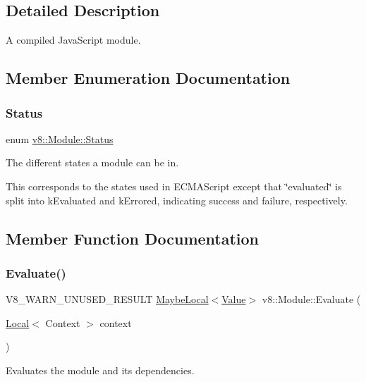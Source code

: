\subsection{Detailed Description}
A compiled Java\+Script module. 

\subsection{Member Enumeration Documentation}
\mbox{\label{classv8_1_1Module_a9c2a22c9cb8e928d570c38648c648b7e}} 
\subsubsection{\texorpdfstring{Status}{Status}}
{\footnotesize\ttfamily enum \mbox{\hyperlink{classv8_1_1Module_a9c2a22c9cb8e928d570c38648c648b7e}{v8\+::\+Module\+::\+Status}}}

The different states a module can be in.

This corresponds to the states used in E\+C\+M\+A\+Script except that \char`\"{}evaluated\char`\"{} is split into k\+Evaluated and k\+Errored, indicating success and failure, respectively. 

\subsection{Member Function Documentation}
\mbox{\label{classv8_1_1Module_a0785fa83cd3dde1dee086e1f9d31abdc}} 
\subsubsection{\texorpdfstring{Evaluate()}{Evaluate()}}
{\footnotesize\ttfamily V8\+\_\+\+W\+A\+R\+N\+\_\+\+U\+N\+U\+S\+E\+D\+\_\+\+R\+E\+S\+U\+LT \mbox{\hyperlink{classv8_1_1MaybeLocal}{Maybe\+Local}}$<$\mbox{\hyperlink{classv8_1_1Value}{Value}}$>$ v8\+::\+Module\+::\+Evaluate (\begin{DoxyParamCaption}\item[{\mbox{\hyperlink{classv8_1_1Local}{Local}}$<$ Context $>$}]{context }\end{DoxyParamCaption})}

Evaluates the module and its dependencies.

